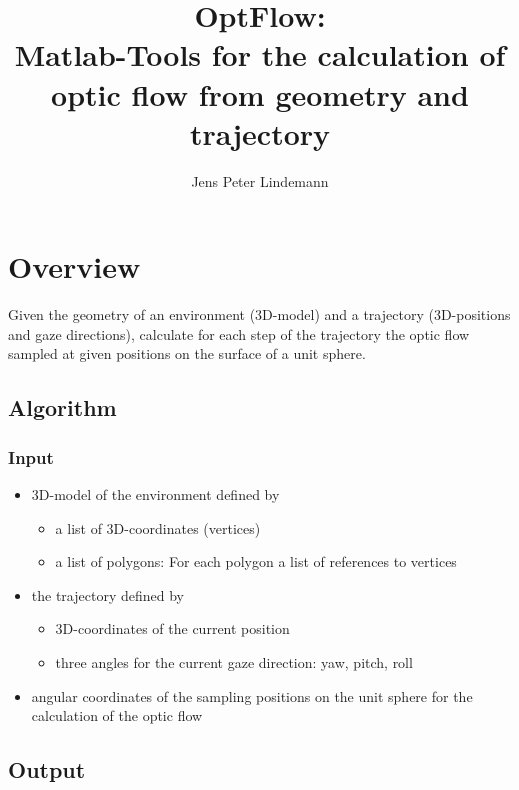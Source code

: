 \documentclass[a4paper]{article}
\begin{document}
\title{OptFlow:\\Matlab-Tools for the calculation of optic flow from
  geometry and trajectory}
\author{Jens Peter Lindemann}
\maketitle

\section{Overview}

Given the geometry of an environment (3D-model) and a trajectory
(3D-positions and gaze directions), calculate for each step of the
trajectory the optic flow sampled at given positions on the surface of
a unit sphere.

\subsection{Algorithm}

\subsubsection{Input}

\begin{itemize}
\item 3D-model of the environment defined by
  \begin{itemize}
  \item a list of 3D-coordinates (vertices)
  \item a list of polygons: For each polygon a list of references to
    vertices
  \end{itemize}

\item the trajectory defined by
  \begin{itemize}  
  \item 3D-coordinates of the current position
  \item three angles for the current gaze direction: yaw, pitch, roll
  \end{itemize}

\item angular coordinates of the sampling positions on the unit sphere
  for the calculation of the optic flow

\end{itemize}

\subsection{Output}
\end{document}

